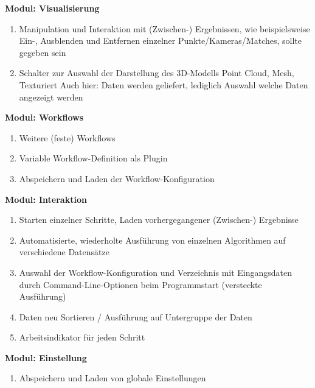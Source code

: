 \textbf{Modul: Visualisierung}
\begin{enumerate}[ align=left, label={\textbf{\textbackslash FK1\arabic*0\textbackslash}} ]
 \item Manipulation und Interaktion mit (Zwischen-) Ergebnissen, wie beispielsweise
Ein-, Ausblenden und Entfernen einzelner Punkte/Kameras/Matches, sollte gegeben sein
 \item Schalter zur Auswahl der Darstellung des 3D-Modells
Point Cloud, Mesh, Texturiert
Auch hier: Daten werden geliefert, lediglich Auswahl welche Daten angezeigt werden
\end{enumerate}
\textbf{Modul: Workflows}
\begin{enumerate}[ align=left, label={\textbf{\textbackslash FK2\arabic*0\textbackslash}} ]
 \item Weitere (feste) Workflows
 \item Variable Workflow-Definition als Plugin
 \item Abspeichern und Laden der Workflow-Konfiguration
\end{enumerate}
\textbf{Modul: Interaktion}
\begin{enumerate}[ align=left, label={\textbf{\textbackslash FK3\arabic*0\textbackslash}} ]
\item Starten einzelner Schritte,
 Laden vorhergegangener (Zwischen-) Ergebnisse
\item Automatisierte, wiederholte Ausführung von einzelnen Algorithmen auf verschiedene Datensätze
\item Auswahl der Workflow-Konfiguration und Verzeichnis mit Eingangsdaten durch Command-Line-Optionen beim Programmstart (versteckte Ausführung)
\item Daten neu Sortieren / Ausführung auf Untergruppe der Daten
\item Arbeitsindikator für jeden Schritt
\end{enumerate}
\textbf{Modul: Einstellung}
\begin{enumerate}[ align=left, label={\textbf{\textbackslash FK4\arabic*0\textbackslash}} ]
\item Abspeichern und Laden von globale Einstellungen
\end{enumerate}

